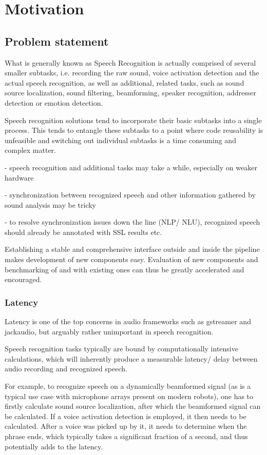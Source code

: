 
\chapter{Motivation}

\section{Problem statement} %
What is generally known as Speech Recognition is actually comprised of several smaller subtasks, i.e. recording the raw sound, voice activation detection and the actual speech recognition, as well as additional, related tasks, such as sound source localization, sound filtering, beamforming, speaker recognition, addresser detection or emotion detection. %

Speech recognition solutions tend to incorporate their basic subtasks into a single process. This tends to entangle these subtasks to a point where code reusability is unfeasible and switching out individual subtasks is a time consuming and complex matter.

- speech recognition and additional tasks may take a while, especially on weaker hardware

- synchronization between recognized speech and other information gathered by sound analysis may be tricky

- to resolve synchronization issues down the line (NLP/ NLU), recognized speech should already be annotated with SSL results etc.

Establishing a stable and comprehensive interface outside and inside the pipeline makes development of new components easy. 
Evaluation of new components and benchmarking of and with existing ones can thus be greatly accelerated and encouraged.%

\subsection{Latency}
Latency is one of the top concerns in audio frameworks such as gstreamer and jackaudio, but arguably rather unimportant in speech recognition. 
	
Speech recognition tasks typically are bound by computationally intensive calculations, which will inherently produce a measurable latency/ delay between audio recording and recognized speech.  
	
For example, to recognize speech on a dynamically beamformed signal (as is a typical use case with microphone arrays present on modern robots), one has to firstly calculate sound source localization, after which the beamformed signal can be calculated.
If a voice activation detection is employed, it then needs to be calculated. 
After a voice was picked up by it, it needs to determine when the phrase ends, which typically takes a significant fraction of a second, and thus potentially adds to the latency. 
	
